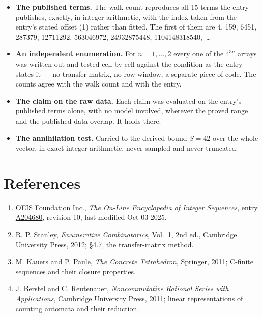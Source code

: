 \documentclass[11pt]{article}
\theoremstyle{definition}
\begin{document}
\begin{itemize}

\item {\bfseries The published terms.} The walk count reproduces all 15 terms the entry publishes, exactly, in integer arithmetic, with the index taken from the entry's stated offset (1) rather than fitted. The first of them are 4, 159, 6451, 287379, 12711292, 563046972, 24932875448, 1104148318540,~\dots

\item {\bfseries An independent enumeration.} For $n = 1,\dots,2$ every one of the $4^{3n}$ arrays was written out and tested cell by cell against the condition as the entry states it --- no transfer matrix, no row window, a separate piece of code. The counts agree with the walk count and with the entry.

\item {\bfseries The claim on the raw data.} Each claim was evaluated on the entry's published terms alone, with no model involved, wherever the proved range and the published data overlap. It holds there.

\item {\bfseries The annihilation test.} Carried to the derived bound $S = 42$ over the whole vector, in exact integer arithmetic, never sampled and never truncated.

\end{itemize}

\section{References}

\begin{enumerate}

\item OEIS Foundation Inc., \emph{The On-Line Encyclopedia of Integer Sequences}, entry \href{https://oeis.org/A204680}{A204680}, revision 10, last modified Oct 03 2025.

\item R. P. Stanley, \emph{Enumerative Combinatorics}, Vol.~1, 2nd ed., Cambridge University Press, 2012; \S4.7, the transfer-matrix method.

\item M. Kauers and P. Paule, \emph{The Concrete Tetrahedron}, Springer, 2011; C-finite sequences and their closure properties.

\item J. Berstel and C. Reutenauer, \emph{Noncommutative Rational Series with Applications}, Cambridge University Press, 2011; linear representations of counting automata and their reduction.

\end{enumerate}
\end{document}
